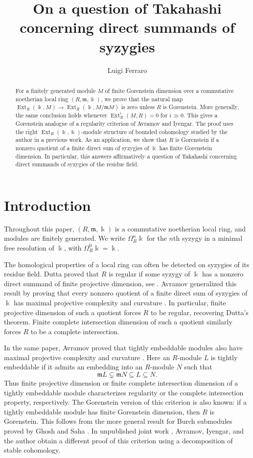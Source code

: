 \documentclass{amsart}
\author[Ferraro]{Luigi Ferraro}
\theoremstyle{definition}
\theoremstyle{definition}
\theoremstyle{remark}
\numberwithin{equation}{section}
\newcommand{\kk}{\Bbbk}
\newcommand{\Ext}{\operatorname{Ext}}
\newcommand{\m}{\mathfrak{m}}
\begin{document}
\title{On a question of Takahashi concerning direct summands of syzygies}


\begin{abstract}
For a finitely generated module $M$ of finite Gorenstein dimension
over a commutative noetherian local ring $(R,\m,\kk)$, we prove
that the natural map
$\Ext_R(\kk,M)\longrightarrow\Ext_R(\kk,M/\m M)$
is zero unless $R$ is Gorenstein. More generally, the same
conclusion holds whenever $\Ext_R^i(M,R)=0$ for $i\gg0$.
This gives a Gorenstein analogue of a regularity criterion of Avramov and
Iyengar. The proof uses the right $\Ext_R(\kk,\kk)$-module
structure of bounded cohomology studied by the author in a previous work. As an application, we show
that $R$ is Gorenstein if a nonzero quotient of a finite direct
sum of syzygies of $\kk$ has finite Gorenstein dimension.
In particular, this answers affirmatively a question of
Takahashi concerning direct summands of syzygies of the
residue field.
\end{abstract}
\maketitle

\section{Introduction}

Throughout this paper, $(R,\m,\kk)$ is a commutative noetherian
local ring, and modules are finitely generated. We write
$\Omega_R^n\kk$ for the $n$th syzygy in a minimal free resolution
of $\kk$, with $\Omega_R^0\kk=\kk$.

The homological properties of a local ring can often be detected
on syzygies of its residue field. Dutta proved that $R$ is regular
if some syzygy of $\kk$ has a nonzero direct summand of finite
projective dimension, see \cite{dutta}. Avramov
generalized this result by proving that every nonzero quotient
of a finite direct sum of syzygies of $\kk$ has maximal projective
complexity and curvature \cite[Corollary 9]{extremal}. In
particular, finite projective dimension of such a quotient forces
$R$ to be regular, recovering Dutta's theorem. Finite complete
intersection dimension of such a quotient similarly forces $R$
to be a complete intersection.

In the same paper, Avramov proved that tightly embeddable modules
also have maximal projective complexity and curvature
\cite[Theorem 4]{extremal}. Here an $R$-module $L$ is tightly
embeddable if it admits an embedding into an $R$-module $N$ such
that
\[
\m L\subsetneq\m N\subseteq L\subseteq N.
\]
Thus finite projective dimension or finite complete intersection
dimension of a tightly embeddable module characterizes regularity
or the complete intersection property, respectively. The
Gorenstein version of this criterion is also known: if a tightly
embeddable module has finite Gorenstein dimension, then $R$ is
Gorenstein. This follows from the more general result for Burch
submodules proved by Ghosh and Saha
\cite[Theorem 5.1]{GhoshSahaBurch}. In unpublished joint work
\cite{AFI}, Avramov, Iyengar, and the author obtain a different
proof of this criterion using a decomposition of stable
cohomology.
\end{document}
